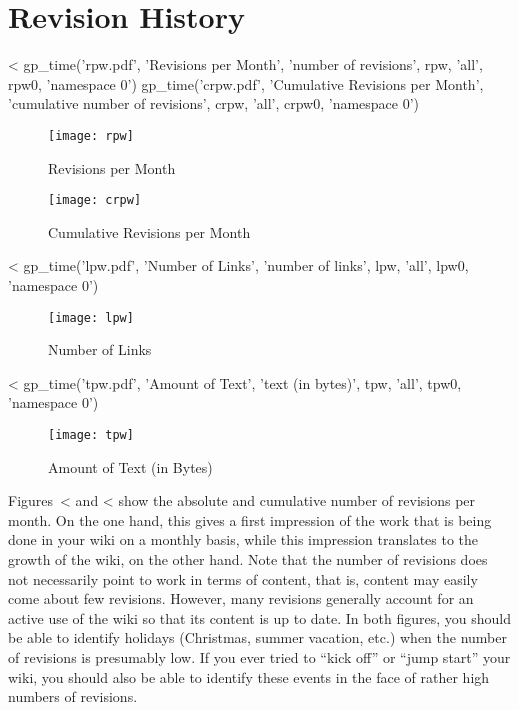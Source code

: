 \documentclass{scrartcl}
\begin{document}

\section{Revision History} %
\label{sec:revision_history}

<%
gp_time('rpw.pdf', 'Revisions per Month', 'number of revisions', 
        rpw, 'all', rpw0, 'namespace 0')
gp_time('crpw.pdf', 'Cumulative Revisions per Month', 
        'cumulative number of revisions',
        crpw, 'all', crpw0, 'namespace 0')
\begin{figure}
	\centering
	\texttt{[image: rpw]}
	\caption{Revisions per Month}
	\label{fig:revisions_per_month}
        \vfill

	\texttt{[image: crpw]}
	\caption{Cumulative Revisions per Month}
	\label{fig:cumulative_revisions_per_month}
\end{figure}

<%
gp_time('lpw.pdf', 'Number of Links', 'number of links', 
        lpw, 'all', lpw0, 'namespace 0')
\begin{figure}
	\centering
	\texttt{[image: lpw]}
	\caption{Number of Links}
	\label{fig:number_of_links}
\end{figure}

<%
gp_time('tpw.pdf', 'Amount of Text', 'text (in bytes)', 
        tpw, 'all', tpw0, 'namespace 0')
\begin{figure}
	\centering
	\texttt{[image: tpw]}
	\caption{Amount of Text (in Bytes)}
	\label{fig:amount_of_text}
\end{figure}

Figures~<%
and 
<%
show the absolute and cumulative number of revisions per month. On the one hand, this gives a first impression of the work that is being done in your wiki on a monthly basis, while this impression translates to the growth of the wiki, on the other hand. Note that the number of revisions does not necessarily point to work in terms of content, that is, content may easily come about few revisions. However, many revisions generally account for an active use of the wiki so that its content is up to date. In both figures, you should be able to identify holidays (Christmas, summer vacation, etc.) when the number of revisions is presumably low. If you ever tried to ``kick off'' or ``jump start'' your wiki, you should also be able to identify these events in the face of rather high numbers of revisions.
\end{document}
